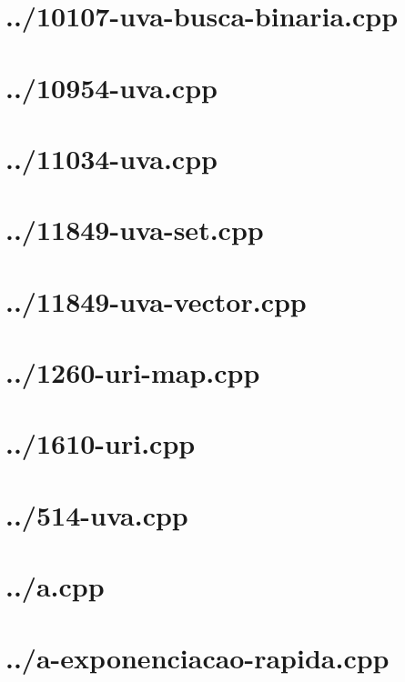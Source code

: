 \documentclass{article}
\begin{document}
\section*{../10107-uva-busca-binaria.cpp}


\section*{../10954-uva.cpp}


\section*{../11034-uva.cpp}


\section*{../11849-uva-set.cpp}


\section*{../11849-uva-vector.cpp}


\section*{../1260-uri-map.cpp}


\section*{../1610-uri.cpp}


\section*{../514-uva.cpp}


\section*{../a.cpp}


\section*{../a-exponenciacao-rapida.cpp}

\end{document}
